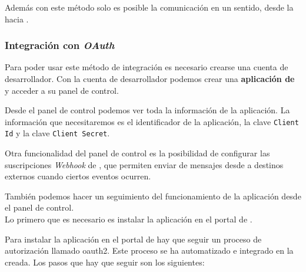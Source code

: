 Además con este método solo es posible la comunicación en un sentido, desde la \iface{} hacia \hs{}.

\subsubsection{Integración con \textit{OAuth}}
\label{subsec:app_hs}

Para poder usar este método de integración es necesario crearse una cuenta de desarrollador. Con la cuenta de desarrollador podemos crear una \textbf{aplicación de \hs{}} y acceder a su panel de control. 

Desde el panel de control podemos ver toda la información de la aplicación. La información que necesitaremos es el identificador de la aplicación, la clave \texttt{Client Id} y la clave \texttt{Client Secret}.

Otra funcionalidad del panel de control es la posibilidad de configurar las suscripciones \textit{Webhook} de \hs{}, que permiten enviar de mensajes desde \hs{} a destinos externos cuando ciertos eventos ocurren.

También podemos hacer un seguimiento del funcionamiento de la aplicación desde el panel de control. \\

Lo primero que es necesario es instalar la aplicación en el portal de \hs{}.

Para instalar la aplicación en el portal de \hs{} hay que seguir un proceso de autorización llamado \gls{oauth2}. Este proceso se ha automatizado e integrado en la \iface{} creada. 
Los pasos que hay que seguir son los siguientes: %

